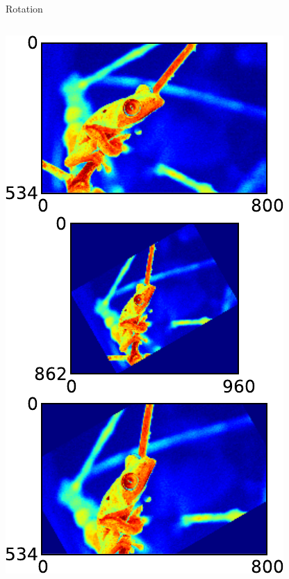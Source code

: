 \documentclass[8pt,a4paper]{beamer}
\begin{document}
\begin{frame}[containsverbatim]{Rotation}
  \begin{columns}
  \includegraphics[width=\textwidth]{figures/grenouille_rotate.pdf} 
  
    \end{columns}
\end{frame}  
\end{document}
